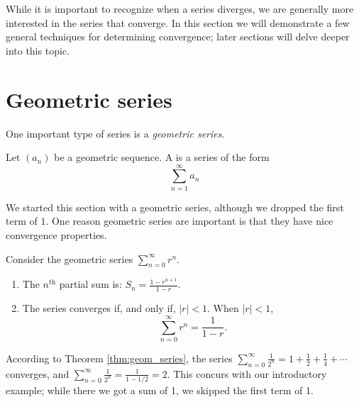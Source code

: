 \documentclass{ximera}
\begin{document}
\begin{example}
\begin{explanation}
\begin{enumerate}

\end{enumerate}
\end{explanation}
\end{example}

While it is important to recognize when a series diverges, we are
generally more interested in the series that converge. In this section
we will demonstrate a few general techniques for determining
convergence; later sections will delve deeper into this topic.

\section{Geometric series}

One important type of series is a \textit{geometric series}.

\begin{definition}
Let $(a_n)$ be a geometric sequence. A  is a
series of the form
\[
\sum_{n=1}^\infty a_n
\]
\end{definition}

We started this section with a geometric series, although we dropped
the first term of $1$. One reason geometric series are important is
that they have nice convergence properties.

\begin{theorem}
Consider the geometric series $\sum_{n=0}^\infty r^n$.
\begin{enumerate}
\item The $n^\text{th}$ partial sum is: $S_n = \frac{1-r^{n+1}}{1-r}$.
\item The series converges if, and only if, $|r| < 1$. When $|r|<1$, 
\[
\sum_{n=0}^\infty r^n = \frac{1}{1-r}.
\]
\end{enumerate}
\end{theorem}

According to Theorem \ref{thm:geom_series}, the series
$\sum_{n=0}^\infty \frac{1}{2^n} = 1+\frac12+\frac14+\cdots$
converges, and $\sum_{n=0}^\infty \frac{1}{2^n} = \frac{1}{1-1/2} =
2.$ This concurs with our introductory example; while there we got a
sum of 1, we skipped the first term of 1.
\end{document}
